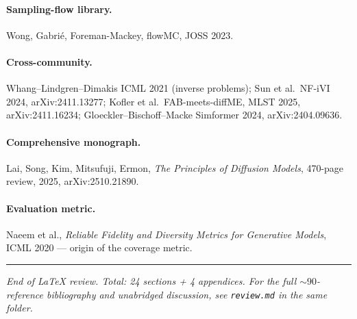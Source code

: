 \documentclass[11pt,letterpaper]{article}
\theoremstyle{plain}
\begin{document}
\paragraph{Sampling-flow library.} Wong, Gabrié, Foreman-Mackey, flowMC, JOSS 2023.

\paragraph{Cross-community.} Whang--Lindgren--Dimakis ICML 2021 (inverse problems);
Sun et al.\ NF-iVI 2024, arXiv:2411.13277; Kofler et al.\ FAB-meets-diffME, MLST
2025, arXiv:2411.16234; Gloeckler--Bischoff--Macke Simformer 2024, arXiv:2404.09636.

\paragraph{Comprehensive monograph.} Lai, Song, Kim, Mitsufuji, Ermon,
\emph{The Principles of Diffusion Models}, 470-page review, 2025, arXiv:2510.21890.

\paragraph{Evaluation metric.} Naeem et al., \emph{Reliable Fidelity and Diversity
Metrics for Generative Models}, ICML 2020 --- origin of the coverage metric.

\bigskip
\noindent\rule{\linewidth}{0.4pt}

\noindent\textit{End of LaTeX review. Total: 24 sections + 4 appendices.
For the full ${\sim}90$-reference bibliography and unabridged discussion, see
\texttt{review.md} in the same folder.}
\end{document}
